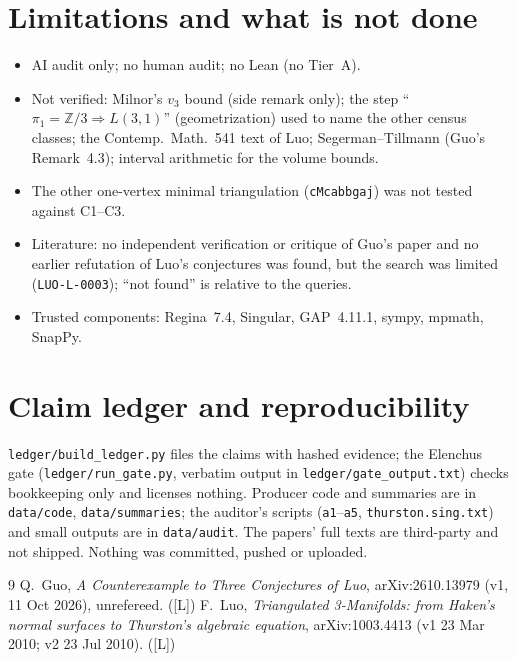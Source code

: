 \documentclass[10pt]{article}
\newcommand{\tier}[1]{\textsf{[#1]}}
\newcommand{\tL}{\tier{L}}
\begin{document}
\section{Limitations and what is not done}\label{sec:lim}
\begin{itemize}\itemsep=1pt
\item AI audit only; no human audit; no Lean (no Tier~A).
\item Not verified: Milnor's $v_3$ bound (side remark only); the step ``$\pi_1=\mathbb Z/3\Rightarrow L(3,1)$'' (geometrization) used to name the other census classes; the Contemp.\ Math.\ 541 text of Luo; Segerman--Tillmann (Guo's Remark~4.3); interval arithmetic for the volume bounds.
\item The other one-vertex minimal triangulation (\texttt{cMcabbgaj}) was not tested against C1--C3.
\item Literature: no independent verification or critique of Guo's paper and no earlier refutation of Luo's conjectures was found, but the search was limited (\texttt{LUO-L-0003}); ``not found'' is relative to the queries.
\item Trusted components: Regina~7.4, Singular, GAP~4.11.1, sympy, mpmath, SnapPy.
\end{itemize}

\section{Claim ledger and reproducibility}\label{sec:ledger}
\texttt{ledger/build\_ledger.py} files the claims with hashed evidence; the Elenchus gate (\texttt{ledger/run\_gate.py}, verbatim output in \texttt{ledger/gate\_output.txt}) checks bookkeeping only and licenses nothing. Producer code and summaries are in \texttt{data/code}, \texttt{data/summaries}; the auditor's scripts (\texttt{a1}--\texttt{a5}, \texttt{thurston.sing.txt}) and small outputs are in \texttt{data/audit}. The papers' full texts are third-party and not shipped. Nothing was committed, pushed or uploaded.

\begin{thebibliography}{9}\small
{} Q.\ Guo, \emph{A Counterexample to Three Conjectures of Luo}, arXiv:2610.13979 (v1, 11 Oct 2026), unrefereed. (\tL)
 F.\ Luo, \emph{Triangulated 3-Manifolds: from Haken's normal surfaces to Thurston's algebraic equation}, arXiv:1003.4413 (v1 23 Mar 2010; v2 23 Jul 2010). (\tL)
\end{thebibliography}
\end{document}
